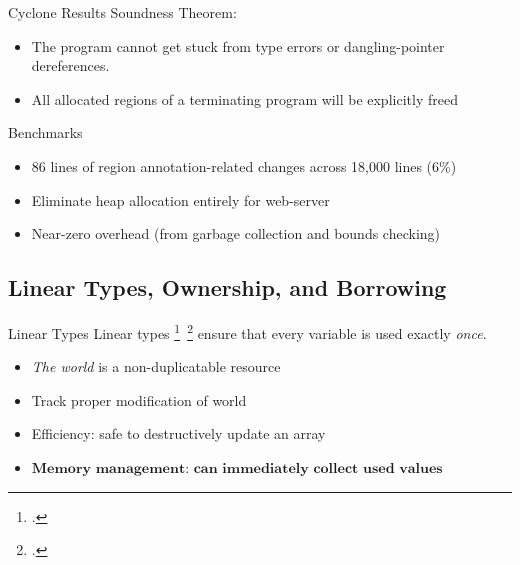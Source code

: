 \documentclass[aspectratio=169]{beamer}
\begin{document}
\begin{frame}{Cyclone Results}
Soundness Theorem:
    \begin{itemize}
        \item The program cannot get stuck from type errors or dangling-pointer dereferences. 
        \item All allocated regions of a terminating program will be explicitly freed 
    \end{itemize}
\pause
Benchmarks
    \begin{itemize}
        \item 86 lines of region annotation-related changes across 18,000 lines (6\%) 
        \item Eliminate heap allocation entirely for web-server
        \item Near-zero overhead (from garbage collection and bounds checking)
    \end{itemize}
\end{frame}


\subsection{Linear Types, Ownership, and Borrowing}

\begin{frame}{Linear Types}
    Linear types \footcite{girard_linear_1987}\ \footcite{wadler_linear_1990} ensure that every variable is used exactly \emph{once}.
    \begin{itemize}[<+->]
        \item \emph{The world} is a non-duplicatable resource %
        \item Track proper modification of world %
        \item Efficiency: safe to destructively update an array
        \item $\textbf{Memory management: can immediately collect used values}$ %
    \end{itemize}
\end{frame}
\end{document}
